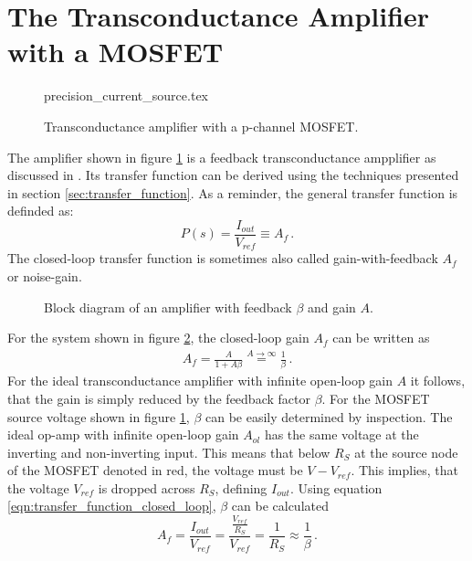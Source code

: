 \documentclass[12pt]{book}
\begin{document}
\section{The Transconductance Amplifier with a MOSFET}
\label{sec:transfer_function_transconductance}
\begin{figure}[ht]
    \centering
    {precision_current_source.tex}
    \caption{Transconductance amplifier with a p-channel MOSFET.}
    \label{fig:transconductance_amplifier}
\end{figure}
The amplifier shown in figure \ref{fig:transconductance_amplifier} is a feedback transconductance ampplifier as discussed in \cite{fet_equations}. Its transfer function can be derived using the techniques presented in section \ref{sec:transfer_function}. As a reminder, the general transfer function is definded as:
\begin{equation}
    P(s) = \frac{I_{out}}{V_{ref}} \equiv A_f \, .
\end{equation}
The closed-loop transfer function is sometimes also called gain-with-feedback $A_f$ \cite{fet_equations} or noise-gain.

\begin{figure}[ht]
    \centering
    \caption{Block diagram of an amplifier with feedback $\beta$ and gain $A$.}
    \label{fig:closed_loop_gain}
\end{figure}
For the system shown in figure \ref{fig:closed_loop_gain}, the closed-loop gain $A_f$ can be written as
\begin{align}
    A_f = \frac{A}{1 + A \beta} \overset{A \to \infty}{=} \frac 1 \beta\,. \label{eqn:transfer_function_closed_loop}
\end{align}
For the ideal transconductance amplifier with infinite open-loop gain $A$ it follows, that the gain is simply reduced by the feedback factor $\beta$. For the MOSFET source voltage shown in figure \ref{fig:transconductance_amplifier}, $\beta$ can be easily determined by inspection. The ideal op-amp with infinite open-loop gain $A_{ol}$ has the same voltage at the inverting and non-inverting input. This means that below $R_S$ at the source node of the MOSFET denoted in red, the voltage must be $V-V_{ref}$. This implies, that the voltage $V_{ref}$ is dropped across $R_S$, defining $I_{out}$. Using equation \ref{eqn:transfer_function_closed_loop}, $\beta$ can be calculated
\begin{equation}
    A_f = \frac{I_{out}}{V_{ref}} = \frac{\frac{V_{ref}}{R_S}}{V_{ref}} = \frac{1}{R_S} \approx \frac 1 \beta \,. \label{eqn:transconductance_amplifier_feedback_factor}
\end{equation}
\end{document}
